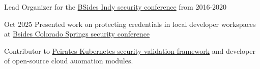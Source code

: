 \begin{zitemize}
	\item Lead Organizer for the \href{https://x.com/indybsides}{BSides Indy security conference} from 2016-2020
	\item Oct 2025 Presented work on protecting credentials in local developer workspaces at \href{https://www.bsidescos.org/}{Bsides Colorado Springs security conference}
	\item Contributor to \href{https://github.com/inguardians/peirates}{Peirates Kubernetes security validation framework} and developer of open-source cloud auomation modules.
\end{zitemize}
